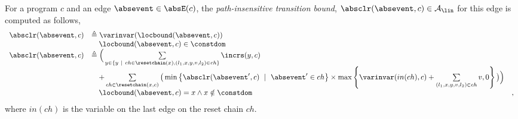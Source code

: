 %
%
\begin{defn}
  \label{def:edge_pathinsensitivebound}
  For a program $c$ and an edge $\absevent \in \absE(c)$, the \emph{path-insensitive transition bound},
  $\absclr(\absevent, c) \in \mathcal{A}_{\lin}$ 
for this edge is
computed as follows,
\[ 
\begin{array}{lll}
  \absclr(\absevent, c) 
  & \triangleq \varinvar(\locbound(\absevent, c))  & \\
  & \quad \locbound(\absevent, c) \in \constdom & \\
  \absclr(\absevent, c) 
  & \triangleq \Big(
    \sum\limits_{y \in \{ y ~|~ 
    ch \in \resetchain(x), (l_1, x, y, v, l_2) \in ch \} } \incrs(y, c) & \\
    & \quad + 
  \sum\limits_{ch \in \resetchain(x, c)}
  \big( \min\left\{\absclr(\absevent', c) ~\mid~ \absevent' \in ch\right\} \times 
  \max\left\{\varinvar(in(ch), c) + \sum\limits_{(l_1, x, y, v, l_2) \in ch } v, 0 \right\}\big) \Big)  & \\
  &  \quad \locbound(\absevent, c) = x \land x \notin \constdom & ,
\end{array}
  \]
 where $in(ch)$ is the variable on the last edge on the reset chain $ch$.
\end{defn}
